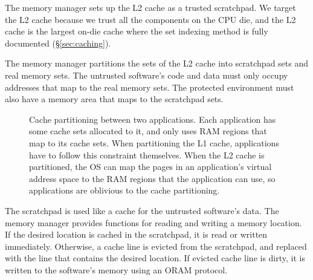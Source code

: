 The memory manager sets up the L2 cache as a trusted scratchpad. We target the
L2 cache because we trust all the components on the CPU die, and the L2 cache
is the largest on-die cache where the set indexing method is fully documented
(\S \ref{sec:caching}).

The memory manager partitions the sets of the L2 cache into scratchpad sets and
real memory sets. The untrusted software's code and data must only occupy
addresses that map to the real memory sets. The protected environment must also
have a memory area that maps to the scratchpad sets.

\begin{figure}[hbtp]
  \caption{
    Cache partitioning between two applications. Each application has some
    cache sets allocated to it, and only uses RAM regions that map to its cache
    sets. When partitioning the L1 cache, applications have to follow this
    constraint themselves. When the L2 cache is partitioned, the OS can map the
    pages in an application's virtual address space to the RAM regions that the
    application can use, so applications are oblivious to the cache
    partitioning.
  }
  \label{fig:cache_partitions}
\end{figure}

The scratchpad is used like a cache for the untrusted software's data. The
memory manager provides functions for reading and writing a memory location.
If the desired location is cached in the scratchpad, it is read or written
immediately. Otherwise, a cache line is evicted from the scratchpad, and
replaced with the line that contains the desired location. If evicted cache
line is dirty, it is written to the software's memory using an ORAM protocol.

